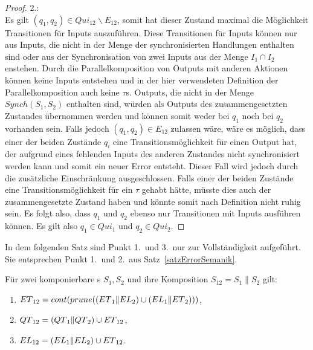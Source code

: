 \begin{proof}
  2.:\\
  Es gilt $(q_1,q_2)\in Qui_{12}\backslash E_{12}$, somit hat
  dieser Zustand maximal die Möglichkeit Transitionen für Inputs auszuführen.
  Diese Transitionen für Inputs können nur aus Inputs, die nicht in der Menge
  der synchronisierten Handlungen enthalten sind oder aus der Synchronisation
  von zwei Inputs aus der Menge $I_1\cap I_2$ enstehen. Durch die
  Parallelkomposition von Outputs mit anderen Aktionen können keine Inputs
  entstehen und in der hier verwendeten Definition der Parallelkomposition auch
  keine $\tau$s. Outputs, die nicht in der Menge $Synch(S_1,S_2)$ enthalten sind,
  würden als Outputs des zusammengesetzten Zustandes übernommen werden und
  können somit weder bei $q_1$ noch bei $q_2$ vorhanden sein. Falls jedoch
  $(q_1,q_2)\in E_{12}$ zulassen wäre, wäre es möglich, dass einer der beiden
  Zustände $q_i$ eine Transitionsmöglichkeit für einen Output hat, der aufgrund
  eines fehlenden Inputs des anderen Zustandes nicht synchronisiert werden kann
  und somit ein neuer Error entsteht. Dieser Fall wird jedoch durch die
  zusätzliche Einschränkung ausgeschlossen. Falls einer der beiden Zustände
  eine Transitionsmöglichkeit für ein $\tau$ gehabt hätte, müsste dies auch der
  zusammengesetzte Zustand haben und könnte somit nach Definition
  nicht ruhig sein. Es folgt also, dass $q_1$ und $q_2$ ebenso nur
  Transitionen mit Inputs ausführen können. Es gilt also $q_1\in Qui_1$ und
  $q_2\in Qui_2$.
\end{proof}

In dem folgenden Satz sind Punkt 1.\ und 3.\ nur zur Vollständigkeit aufgeführt.
Sie entsprechen Punkt 1.\ und 2.\ aus Satz~\ref{satzErrorSemanik}.

\begin{satz}
  \label{satzQuiSemantik}
  Für zwei komponierbare \EIO{}s $S_1, S_2$ und ihre Komposition $S_{12} =
  S_1\|S_2$ gilt:
  \begin{enumerate}
    \item $ET{}_{12} = cont{}(prune{}((ET{}_1\|EL{}_2)\cup
      (EL{}_1\|ET{}_2)))$,
    \item $QT{}_{12} = (QT{}_1\|QT{}_2)\cup ET{}_{12}$,
    \item $EL{}_{12} = (EL{}_1\|EL{}_2)\cup ET{}_{12}$.
  \end{enumerate}
\end{satz}

